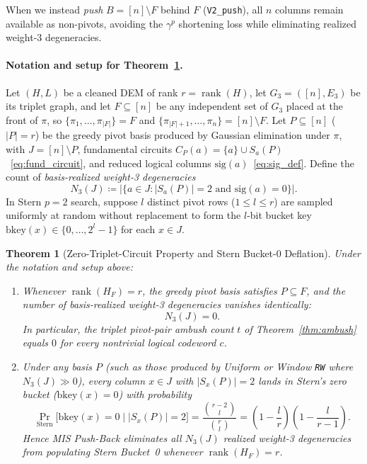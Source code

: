 \documentclass[12pt]{article}
\newtheorem{theorem}{Theorem}
\theoremstyle{definition}
\DeclareMathOperator{\rank}{rank}
\newcommand{\ttt}[1]{\texttt{#1}}
\begin{document}
\medskip
When we instead \emph{push} $B = [n] \setminus F$ behind $F$ (\ttt{V2\_push}), all $n$ columns remain available as
non-pivots, avoiding the $\gamma^p$ shortening loss while eliminating realized weight-3 degeneracies.

\paragraph{Notation and setup for Theorem~\ref{thm:mis_push}.}
Let $(H, L)$ be a cleaned DEM of rank $r = \rank(H)$, let $G_3 = ([n], E_3)$ be its triplet graph, and let $F
\subseteq [n]$ be any independent set of $G_3$ placed at the front of $\pi$, so $\{\pi_1, \dots, \pi_{|F|}\} = F$
and $\{\pi_{|F|+1}, \dots, \pi_n\} = [n] \setminus F$. Let $P \subseteq [n]$ ($|P| = r$) be the greedy pivot basis
produced by Gaussian elimination under $\pi$, with $J = [n] \setminus P$, fundamental circuits $C_P(a) = \{a\} \cup
S_a(P)$~\eqref{eq:fund_circuit}, and reduced logical columns $\mathrm{sig}(a)$~\eqref{eq:sig_def}. Define the count
of \emph{basis-realized weight-3 degeneracies}
\begin{equation}\label{eq:N3J_def}
  N_3(J) \coloneqq \bigl|\bigl\{a \in J : |S_a(P)| = 2 \text{ and } \mathrm{sig}(a) = 0\bigr\}\bigr|.
\end{equation}
In Stern $p = 2$ search, suppose $l$ distinct pivot rows ($1 \le l \le r$) are sampled uniformly at random without
replacement to form the $l$-bit bucket key $\mathrm{bkey}(x) \in \{0, \dots, 2^l - 1\}$ for each $x \in J$.

\begin{theorem}[Zero-Triplet-Circuit Property and Stern Bucket-0 Deflation]\label{thm:mis_push}
Under the notation and setup above:
\begin{enumerate}[label=(\alph*)]
  \item Whenever $\rank(H_F) = r$, the greedy pivot basis satisfies $P \subseteq F$, and the number of
    basis-realized weight-3 degeneracies vanishes identically:
    \begin{equation}\label{eq:N3_zero}
      N_3(J) = 0.
    \end{equation}
    In particular, the triplet pivot-pair ambush count $t$ of Theorem~\ref{thm:ambush} equals $0$ for every
    nontrivial logical codeword $c$.
  \item Under any basis $P$ (such as those produced by Uniform or Window \ttt{RW} where $N_3(J) \gg 0$), every
    column $x \in J$ with $|S_x(P)| = 2$ lands in Stern's zero bucket ($\mathrm{bkey}(x) = 0$) with probability
    \begin{equation}\label{eq:bucket0_prob}
      \Pr_{\mathrm{Stern}}\bigl[\mathrm{bkey}(x) = 0 \;\big|\; |S_x(P)| = 2\bigr]
      = \frac{\binom{r - 2}{l}}{\binom{r}{l}}
      = \left(1 - \frac{l}{r}\right)\left(1 - \frac{l}{r - 1}\right).
    \end{equation}
    Hence MIS Push-Back eliminates all $N_3(J)$ realized weight-3 degeneracies from populating Stern Bucket~0
    whenever $\rank(H_F) = r$.
\end{enumerate}
\end{theorem}
\end{document}
